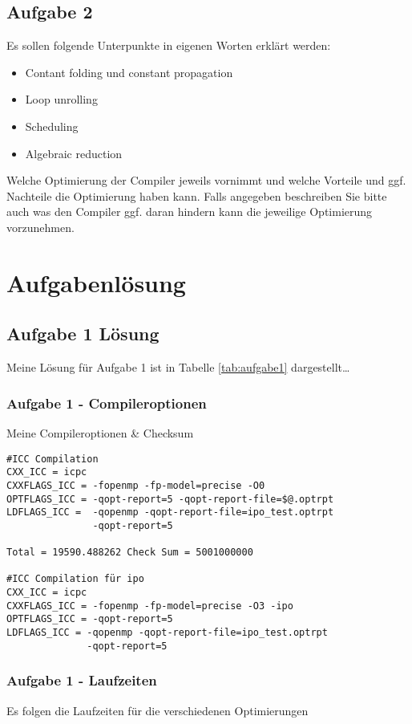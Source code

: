 \documentclass{article}
\begin{document}
  \subsection{Aufgabe 2} 
  Es sollen folgende Unterpunkte in eigenen Worten erklärt werden:
  \begin{itemize}
    \item Contant folding und constant propagation
    \item Loop unrolling
    \item Scheduling
    \item Algebraic reduction
  \end{itemize}
Welche Optimierung der Compiler jeweils vornimmt und welche Vorteile und ggf.
Nachteile die Optimierung haben kann. Falls angegeben beschreiben Sie bitte
auch was den Compiler ggf. daran hindern kann die jeweilige Optimierung
vorzunehmen.

\section{Aufgabenlösung}

\subsection{Aufgabe 1 Lösung} 
Meine Lösung für Aufgabe 1 ist in Tabelle \ref{tab:aufgabe1} dargestellt\dots

\subsubsection{Aufgabe 1 - Compileroptionen}
Meine Compileroptionen \& Checksum
\begin{verbatim}
#ICC Compilation
CXX_ICC = icpc
CXXFLAGS_ICC = -fopenmp -fp-model=precise -O0
OPTFLAGS_ICC = -qopt-report=5 -qopt-report-file=$@.optrpt
LDFLAGS_ICC =  -qopenmp -qopt-report-file=ipo_test.optrpt 
               -qopt-report=5

Total = 19590.488262 Check Sum = 5001000000

#ICC Compilation für ipo
CXX_ICC = icpc
CXXFLAGS_ICC = -fopenmp -fp-model=precise -O3 -ipo
OPTFLAGS_ICC = -qopt-report=5
LDFLAGS_ICC = -qopenmp -qopt-report-file=ipo_test.optrpt 
              -qopt-report=5
\end{verbatim}

\subsubsection{Aufgabe 1 - Laufzeiten}
Es folgen die Laufzeiten für die verschiedenen Optimierungen
\end{document}
